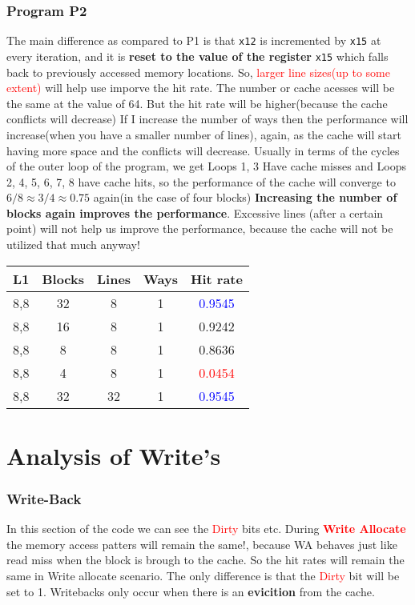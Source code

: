 \subsubsection{Program P2}
The main difference as compared to P1 is that \verb|x12| is incremented by \verb|x15| at every iteration, and it is \textbf{reset to the value of the register} \verb|x15|
which falls back to previously accessed memory locations. So, \textcolor{red}{larger line sizes(up to some extent)} will help use imporve the hit rate. The number or cache acesses 
will be the same at the value of 64. But the hit rate will be higher(because the cache conflicts will decrease) If I increase the number of ways then the performance will increase(when you have a smaller number
of lines), again, as the cache will start having more space and the conflicts will decrease. Usually in terms of the cycles of the outer loop of the program, we get
Loops 1, 3 Have cache misses and Loops 2, 4, 5, 6, 7, 8 have cache hits, so the performance of the cache will converge to $6/8 \approx 3/4 \approx 0.75$ again(in the case of four blocks)
\textbf{Increasing the number of blocks again improves the performance}. Excessive lines (after a certain point) will not help us improve the performance, because the cache will not be utilized that much anyway!
\\
\begin{center}
\begin{tabular}{c | c | c | c | c}
L1 & Blocks & Lines & Ways &  Hit rate\\
\hline
8,8 & 32 & 8 & 1 & \textcolor{blue}{0.9545}\\
\hline
8,8 & 16 & 8 & 1 & 0.9242\\
\hline
8,8 & 8 & 8 & 1 & 0.8636\\
\hline
8,8 & 4 & 8 & 1 & \textcolor{red}{0.0454}   \\
\hline
8,8 & 32 & 32 & 1 & \textcolor{blue}{0.9545}\\
\hline
\end{tabular}
\end{center}

\section{Analysis of Write's}

\subsubsection{Write-Back}
In this section of the code we can see the \textcolor{red}{Dirty} bits etc. During \textbf{\textcolor{red}{Write Allocate}} the memory access patters will 
remain the same!, because WA behaves just like read miss when the block is brough to the cache. So the hit rates will remain the same in Write allocate scenario.
The only difference is that the \textcolor{red}{Dirty} bit will be set to 1. Writebacks only occur when there is an \textbf{evicition} from the cache.
